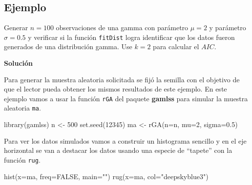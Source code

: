 \documentclass[
]{book}
\makeatletter
\newenvironment{Shaded}{\begin{snugshade}}{\end{snugshade}}
\newcommand{\AttributeTok}[1]{\textcolor[rgb]{0.77,0.63,0.00}{#1}}
\newcommand{\ConstantTok}[1]{\textcolor[rgb]{0.00,0.00,0.00}{#1}}
\newcommand{\DecValTok}[1]{\textcolor[rgb]{0.00,0.00,0.81}{#1}}
\newcommand{\FloatTok}[1]{\textcolor[rgb]{0.00,0.00,0.81}{#1}}
\newcommand{\FunctionTok}[1]{\textcolor[rgb]{0.00,0.00,0.00}{#1}}
\newcommand{\NormalTok}[1]{#1}
\newcommand{\OtherTok}[1]{\textcolor[rgb]{0.56,0.35,0.01}{#1}}
\newcommand{\StringTok}[1]{\textcolor[rgb]{0.31,0.60,0.02}{#1}}
\newenvironment{kframe}{%
\medskip{}
\setlength{\fboxsep}{.8em}
 \def\at@end@of@kframe{}%
 \ifinner\ifhmode%
  \def\at@end@of@kframe{\end{minipage}}%
  \begin{minipage}{\columnwidth}%
 \fi\fi%
 \def\FrameCommand##1{\hskip\@totalleftmargin \hskip-\fboxsep
 \colorbox{shadecolor}{##1}\hskip-\fboxsep
     \hskip-\linewidth \hskip-\@totalleftmargin \hskip\columnwidth}%
 \MakeFramed {\advance\hsize-\width
   \@totalleftmargin\z@ \linewidth\hsize
   \@setminipage}}%
 {\par\unskip\endMakeFramed%
 \at@end@of@kframe}
\renewenvironment{Shaded}{\begin{kframe}}{\end{kframe}}
\makeatother
\begin{document}
\hypertarget{ejemplo-54}{%
\subsection*{Ejemplo}\label{ejemplo-54}}

Generar \(n=100\) observaciones de una gamma con parámetro \(\mu=2\) y parámetro \(\sigma=0.5\) y verificar si la función \texttt{fitDist} logra identificar que los datos fueron generados de una distribución gamma. Use \(k=2\) para calcular el \(AIC\).

\textbf{Solución}

Para generar la muestra aleatoria solicitada se fijó la semilla con el objetivo de que el lector pueda obtener los mismos resultados de este ejemplo. En este ejemplo vamos a usar la función \texttt{rGA} del paquete \textbf{gamlss} para simular la muestra aleatoria \texttt{ma}.

\begin{Shaded}
\begin{Highlighting}[]
\FunctionTok{library}\NormalTok{(gamlss)}
\NormalTok{n }\OtherTok{\textless{}{-}} \DecValTok{500}
\FunctionTok{set.seed}\NormalTok{(}\DecValTok{12345}\NormalTok{)}
\NormalTok{ma }\OtherTok{\textless{}{-}} \FunctionTok{rGA}\NormalTok{(}\AttributeTok{n=}\NormalTok{n, }\AttributeTok{mu=}\DecValTok{2}\NormalTok{, }\AttributeTok{sigma=}\FloatTok{0.5}\NormalTok{)}
\end{Highlighting}
\end{Shaded}

Para ver los datos simulados vamos a construir un histograma sencillo y en el eje horizontal se van a destacar los datos usando una especie de ``tapete'' con la función \texttt{rug}.

\begin{Shaded}
\begin{Highlighting}[]
\FunctionTok{hist}\NormalTok{(}\AttributeTok{x=}\NormalTok{ma, }\AttributeTok{freq=}\ConstantTok{FALSE}\NormalTok{, }\AttributeTok{main=}\StringTok{""}\NormalTok{)}
\FunctionTok{rug}\NormalTok{(}\AttributeTok{x=}\NormalTok{ma, }\AttributeTok{col=}\StringTok{"deepskyblue3"}\NormalTok{)}
\end{Highlighting}
\end{Shaded}
\end{document}
